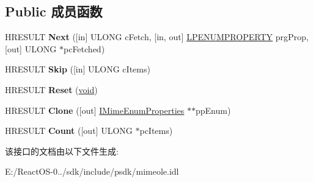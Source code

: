 \subsection*{Public 成员函数}
\begin{DoxyCompactItemize}
\item 
\mbox{\label{interface_m_i_m_e_o_l_e_1_1_i_mime_enum_properties_a2db3643e089f37fac48eb424d247d5b8}} 
H\+R\+E\+S\+U\+LT {\bfseries Next} (\mbox{[}in\mbox{]} U\+L\+O\+NG c\+Fetch, \mbox{[}in, out\mbox{]} \hyperlink{struct_m_i_m_e_o_l_e_1_1_i_mime_enum_properties_1_1tag_e_n_u_m_p_r_o_p_e_r_t_y}{L\+P\+E\+N\+U\+M\+P\+R\+O\+P\+E\+R\+TY} prg\+Prop, \mbox{[}out\mbox{]} U\+L\+O\+NG $\ast$pc\+Fetched)
\item 
\mbox{\label{interface_m_i_m_e_o_l_e_1_1_i_mime_enum_properties_ad598374fc03fe4e4e3fb0f18ddfd544e}} 
H\+R\+E\+S\+U\+LT {\bfseries Skip} (\mbox{[}in\mbox{]} U\+L\+O\+NG c\+Items)
\item 
\mbox{\label{interface_m_i_m_e_o_l_e_1_1_i_mime_enum_properties_a5ce014791834c19748a39c50ad77177a}} 
H\+R\+E\+S\+U\+LT {\bfseries Reset} (\hyperlink{interfacevoid}{void})
\item 
\mbox{\label{interface_m_i_m_e_o_l_e_1_1_i_mime_enum_properties_a45ad2901fea9786149f60a281a3e55ef}} 
H\+R\+E\+S\+U\+LT {\bfseries Clone} (\mbox{[}out\mbox{]} \hyperlink{interface_m_i_m_e_o_l_e_1_1_i_mime_enum_properties}{I\+Mime\+Enum\+Properties} $\ast$$\ast$pp\+Enum)
\item 
\mbox{\label{interface_m_i_m_e_o_l_e_1_1_i_mime_enum_properties_ac98f204d6e55fbb3b5591037c7da99af}} 
H\+R\+E\+S\+U\+LT {\bfseries Count} (\mbox{[}out\mbox{]} U\+L\+O\+NG $\ast$pc\+Items)
\end{DoxyCompactItemize}


该接口的文档由以下文件生成\+:\begin{DoxyCompactItemize}
\item 
E\+:/\+React\+O\+S-\/0../sdk/include/psdk/mimeole.\+idl\end{DoxyCompactItemize}
